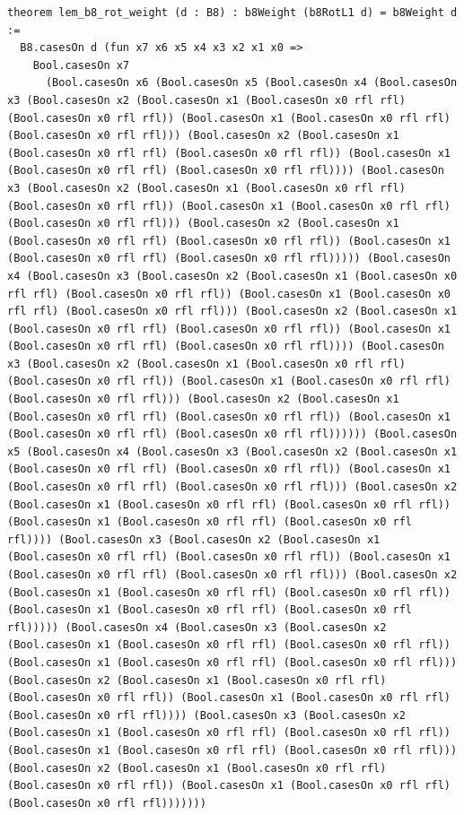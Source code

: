 \documentclass[11pt,letterpaper]{article}
\theoremstyle{spectralthm}
\begin{document}
\begin{lstlisting}[language=Lean4,caption={Standalone Pure Init.Prelude Term-Mode Lean 4 Kernel Suite (thm30--thm61, v0.0.0, 0 sorry, 0 axioms).},label={lst:lean_unified}]
theorem lem_b8_rot_weight (d : B8) : b8Weight (b8RotL1 d) = b8Weight d :=
  B8.casesOn d (fun x7 x6 x5 x4 x3 x2 x1 x0 =>
    Bool.casesOn x7
      (Bool.casesOn x6 (Bool.casesOn x5 (Bool.casesOn x4 (Bool.casesOn x3 (Bool.casesOn x2 (Bool.casesOn x1 (Bool.casesOn x0 rfl rfl) (Bool.casesOn x0 rfl rfl)) (Bool.casesOn x1 (Bool.casesOn x0 rfl rfl) (Bool.casesOn x0 rfl rfl))) (Bool.casesOn x2 (Bool.casesOn x1 (Bool.casesOn x0 rfl rfl) (Bool.casesOn x0 rfl rfl)) (Bool.casesOn x1 (Bool.casesOn x0 rfl rfl) (Bool.casesOn x0 rfl rfl)))) (Bool.casesOn x3 (Bool.casesOn x2 (Bool.casesOn x1 (Bool.casesOn x0 rfl rfl) (Bool.casesOn x0 rfl rfl)) (Bool.casesOn x1 (Bool.casesOn x0 rfl rfl) (Bool.casesOn x0 rfl rfl))) (Bool.casesOn x2 (Bool.casesOn x1 (Bool.casesOn x0 rfl rfl) (Bool.casesOn x0 rfl rfl)) (Bool.casesOn x1 (Bool.casesOn x0 rfl rfl) (Bool.casesOn x0 rfl rfl))))) (Bool.casesOn x4 (Bool.casesOn x3 (Bool.casesOn x2 (Bool.casesOn x1 (Bool.casesOn x0 rfl rfl) (Bool.casesOn x0 rfl rfl)) (Bool.casesOn x1 (Bool.casesOn x0 rfl rfl) (Bool.casesOn x0 rfl rfl))) (Bool.casesOn x2 (Bool.casesOn x1 (Bool.casesOn x0 rfl rfl) (Bool.casesOn x0 rfl rfl)) (Bool.casesOn x1 (Bool.casesOn x0 rfl rfl) (Bool.casesOn x0 rfl rfl)))) (Bool.casesOn x3 (Bool.casesOn x2 (Bool.casesOn x1 (Bool.casesOn x0 rfl rfl) (Bool.casesOn x0 rfl rfl)) (Bool.casesOn x1 (Bool.casesOn x0 rfl rfl) (Bool.casesOn x0 rfl rfl))) (Bool.casesOn x2 (Bool.casesOn x1 (Bool.casesOn x0 rfl rfl) (Bool.casesOn x0 rfl rfl)) (Bool.casesOn x1 (Bool.casesOn x0 rfl rfl) (Bool.casesOn x0 rfl rfl)))))) (Bool.casesOn x5 (Bool.casesOn x4 (Bool.casesOn x3 (Bool.casesOn x2 (Bool.casesOn x1 (Bool.casesOn x0 rfl rfl) (Bool.casesOn x0 rfl rfl)) (Bool.casesOn x1 (Bool.casesOn x0 rfl rfl) (Bool.casesOn x0 rfl rfl))) (Bool.casesOn x2 (Bool.casesOn x1 (Bool.casesOn x0 rfl rfl) (Bool.casesOn x0 rfl rfl)) (Bool.casesOn x1 (Bool.casesOn x0 rfl rfl) (Bool.casesOn x0 rfl rfl)))) (Bool.casesOn x3 (Bool.casesOn x2 (Bool.casesOn x1 (Bool.casesOn x0 rfl rfl) (Bool.casesOn x0 rfl rfl)) (Bool.casesOn x1 (Bool.casesOn x0 rfl rfl) (Bool.casesOn x0 rfl rfl))) (Bool.casesOn x2 (Bool.casesOn x1 (Bool.casesOn x0 rfl rfl) (Bool.casesOn x0 rfl rfl)) (Bool.casesOn x1 (Bool.casesOn x0 rfl rfl) (Bool.casesOn x0 rfl rfl))))) (Bool.casesOn x4 (Bool.casesOn x3 (Bool.casesOn x2 (Bool.casesOn x1 (Bool.casesOn x0 rfl rfl) (Bool.casesOn x0 rfl rfl)) (Bool.casesOn x1 (Bool.casesOn x0 rfl rfl) (Bool.casesOn x0 rfl rfl))) (Bool.casesOn x2 (Bool.casesOn x1 (Bool.casesOn x0 rfl rfl) (Bool.casesOn x0 rfl rfl)) (Bool.casesOn x1 (Bool.casesOn x0 rfl rfl) (Bool.casesOn x0 rfl rfl)))) (Bool.casesOn x3 (Bool.casesOn x2 (Bool.casesOn x1 (Bool.casesOn x0 rfl rfl) (Bool.casesOn x0 rfl rfl)) (Bool.casesOn x1 (Bool.casesOn x0 rfl rfl) (Bool.casesOn x0 rfl rfl))) (Bool.casesOn x2 (Bool.casesOn x1 (Bool.casesOn x0 rfl rfl) (Bool.casesOn x0 rfl rfl)) (Bool.casesOn x1 (Bool.casesOn x0 rfl rfl) (Bool.casesOn x0 rfl rfl)))))))

\end{lstlisting}
\end{document}
